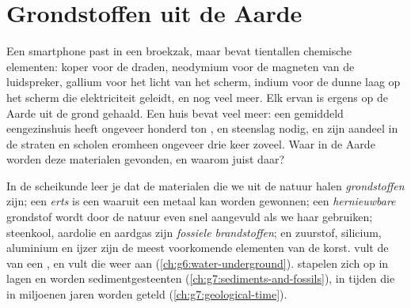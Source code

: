 \chapter{Grondstoffen uit de Aarde}\label{ch:g9:earth-resources}

Een smartphone past in een broekzak, maar bevat tientallen chemische
elementen: koper voor de draden, neodymium voor de magneten van de
luidspreker, gallium voor het licht van het scherm, indium voor de dunne
laag op het scherm die elektriciteit geleidt, en nog veel meer. Elk ervan
is ergens op de Aarde uit de grond gehaald. Een huis bevat veel meer: een
gemiddeld eengezinshuis heeft ongeveer honderd ton ,  en
steenslag nodig, en zijn aandeel in de straten en scholen eromheen
ongeveer drie keer zoveel. Waar in de Aarde worden deze materialen
gevonden, en waarom juist daar?

\begin{recall}
In de scheikunde leer je dat de materialen die we uit de natuur halen
\emph{grondstoffen} zijn; een \emph{erts} is een  waaruit een
metaal kan worden gewonnen; een \emph{hernieuwbare} grondstof wordt door de
natuur even snel aangevuld als we haar gebruiken; steenkool, aardolie en
aardgas zijn \emph{fossiele brandstoffen}; en zuurstof, silicium,
aluminium en ijzer zijn de meest voorkomende elementen van de korst.
 vult de  van een , en  vult die
weer aan (\cref{ch:g6:water-underground}).  stapelen zich op in
lagen en worden sedimentgesteenten (\cref{ch:g7:sediments-and-fossils}),
in tijden die in miljoenen jaren worden geteld
(\cref{ch:g7:geological-time}).
\end{recall}

